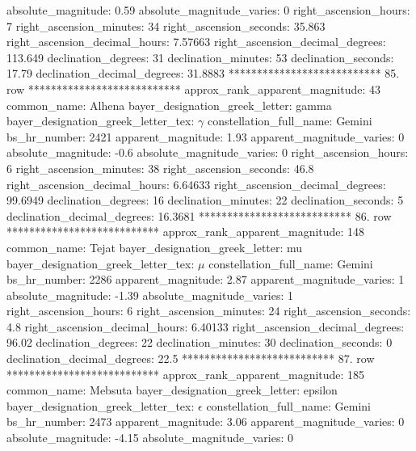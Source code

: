                 absolute_magnitude: 0.59
         absolute_magnitude_varies: 0
             right_ascension_hours: 7
           right_ascension_minutes: 34
           right_ascension_seconds: 35.863
     right_ascension_decimal_hours: 7.57663
   right_ascension_decimal_degrees: 113.649
               declination_degrees: 31
               declination_minutes: 53
               declination_seconds: 17.79
       declination_decimal_degrees: 31.8883
*************************** 85. row ***************************
    approx_rank_apparent_magnitude: 43
                       common_name: Alhena
    bayer_designation_greek_letter: gamma
bayer_designation_greek_letter_tex: $\gamma$
           constellation_full_name: Gemini
                      bs_hr_number: 2421
                apparent_magnitude: 1.93
         apparent_magnitude_varies: 0
                absolute_magnitude: -0.6
         absolute_magnitude_varies: 0
             right_ascension_hours: 6
           right_ascension_minutes: 38
           right_ascension_seconds: 46.8
     right_ascension_decimal_hours: 6.64633
   right_ascension_decimal_degrees: 99.6949
               declination_degrees: 16
               declination_minutes: 22
               declination_seconds: 5
       declination_decimal_degrees: 16.3681
*************************** 86. row ***************************
    approx_rank_apparent_magnitude: 148
                       common_name: Tejat
    bayer_designation_greek_letter: mu
bayer_designation_greek_letter_tex: $\mu$
           constellation_full_name: Gemini
                      bs_hr_number: 2286
                apparent_magnitude: 2.87
         apparent_magnitude_varies: 1
                absolute_magnitude: -1.39
         absolute_magnitude_varies: 1
             right_ascension_hours: 6
           right_ascension_minutes: 24
           right_ascension_seconds: 4.8
     right_ascension_decimal_hours: 6.40133
   right_ascension_decimal_degrees: 96.02
               declination_degrees: 22
               declination_minutes: 30
               declination_seconds: 0
       declination_decimal_degrees: 22.5
*************************** 87. row ***************************
    approx_rank_apparent_magnitude: 185
                       common_name: Mebsuta
    bayer_designation_greek_letter: epsilon
bayer_designation_greek_letter_tex: $\epsilon$
           constellation_full_name: Gemini
                      bs_hr_number: 2473
                apparent_magnitude: 3.06
         apparent_magnitude_varies: 0
                absolute_magnitude: -4.15
         absolute_magnitude_varies: 0
